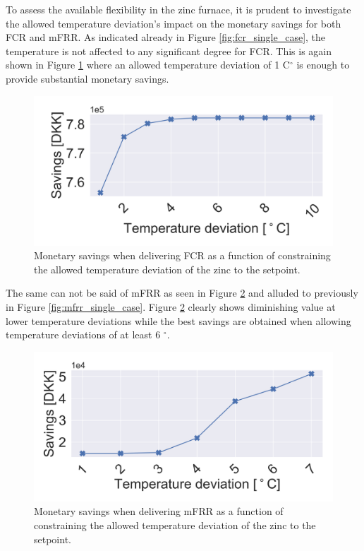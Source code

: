 \documentclass[lettersize,journal]{IEEEtran}
\begin{document}
To assess the available flexibility in the zinc furnace, it is prudent to investigate the allowed temperature deviation's impact on the monetary savings for both FCR and mFRR. As indicated already in Figure \ref{fig:fcr_single_case}, the temperature is not affected to any significant degree for FCR. This is again shown in Figure \ref{fig:profit_vs_delta_temp_fcr} where an allowed temperature deviation of 1 C$^{\circ}$ is enough to provide substantial monetary savings.

\begin{figure}[!t]
    \centering
    \includegraphics[width=\columnwidth]{figures/profit_vs_delta_temp_fcr.png}
    \caption{Monetary savings when delivering FCR as a function of constraining the allowed temperature deviation of the zinc to the setpoint.}
    \label{fig:profit_vs_delta_temp_fcr}
\end{figure}

The same can not be said of mFRR as seen in Figure \ref{fig:profit_vs_delta_temp_mfrr} and alluded to previously in Figure \ref{fig:mfrr_single_case}. Figure \ref{fig:profit_vs_delta_temp_mfrr} clearly shows diminishing value at lower temperature deviations while the best savings are obtained when allowing temperature deviations of at least 6 $^{\circ}$.

\begin{figure}[!t]
    \centering
    \includegraphics[width=\columnwidth]{figures/profit_vs_delta_temp_mfrr_and_energy.png}
    \caption{Monetary savings when delivering mFRR as a function of constraining the allowed temperature deviation of the zinc to the setpoint.}
    \label{fig:profit_vs_delta_temp_mfrr}
\end{figure}
\end{document}
